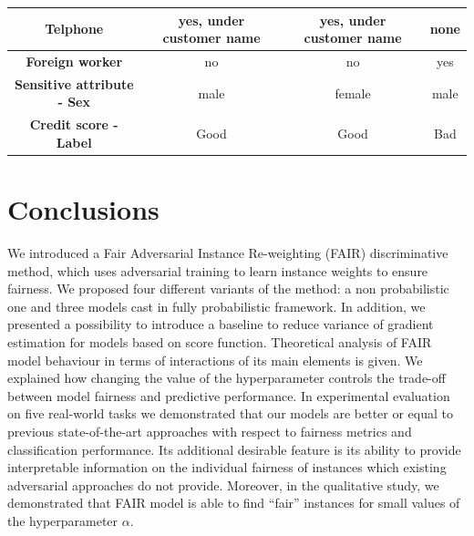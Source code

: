 \documentclass[preprint,12pt]{elsarticle}
\begin{document}
\begin{table}
{\begin{tabular}{|c|c|c|c|}
		\textbf{Telphone}                                        & yes,   under customer name & yes,   under customer name                                                           & none                                                                                 \\ \hline
		\textbf{Foreign worker}                                  & no                         & no                                                                                   & yes                                                                                  \\ \hline
		\textbf{Sensitive attribute - Sex}                                             & male                       & female                                                                               & male                                                                                 \\ \hline
		\textbf{Credit score -Label}                                           & Good                       & Good                                                                                 & Bad                                                                                  \\ \hline
	\end{tabular}}
	\label{tab:Explainability}
\end{table}

\section{Conclusions}
\label{Sec:Conclusion}
We introduced a Fair Adversarial Instance Re-weighting (FAIR) discriminative method, which uses adversarial training to learn instance weights to ensure fairness. We proposed four different variants of the method: a non probabilistic one and three models cast in fully probabilistic framework. In addition, we presented a possibility to introduce a baseline to reduce variance of gradient estimation for models based on score function. Theoretical analysis of FAIR model behaviour in terms of interactions of its main elements is given. We explained how changing the value of the hyperparameter controls the trade-off between model fairness and predictive performance. In experimental evaluation on five real-world tasks we demonstrated that our models are better or equal to previous state-of-the-art approaches with respect to fairness metrics and classification performance. Its additional desirable feature is its ability to provide interpretable information on the individual fairness of instances which existing adversarial approaches do not provide. Moreover, in the qualitative study, we demonstrated that FAIR model is able to find ``fair'' instances for small values of the hyperparameter $\alpha$.
\end{document}
